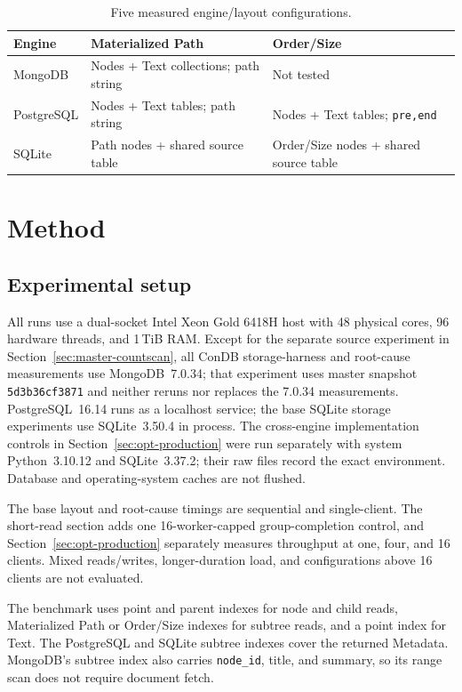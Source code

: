 \documentclass[10pt]{article}
\newcommand{\code}[1]{\texttt{#1}}
\newcommand{\hdr}{\rowcolor{hdrgray}}
\newenvironment{ctab}{\par\smallskip\centering\small
  \setlength{\tabcolsep}{5pt}\renewcommand{\arraystretch}{1.12}}{\par\smallskip}
\begin{document}
\begin{table}[ht]
\caption{Five measured engine/layout configurations.}
\label{tab:layouts}
\begin{ctab}
\begin{tabular}{@{}lll@{}}
\toprule
\hdr Engine & Materialized Path & Order/Size \\
\midrule
MongoDB    & Nodes + Text collections; path string & Not tested \\
PostgreSQL & Nodes + Text tables; path string      & Nodes + Text tables; \code{pre,end} \\
SQLite     & Path nodes + shared source table       & Order/Size nodes + shared source table \\
\bottomrule
\end{tabular}
\end{ctab}
\end{table}

\section{Method}\label{sec:method}

\subsection{Experimental setup}

All runs use a dual-socket Intel Xeon Gold 6418H host with 48 physical cores,
96 hardware threads, and 1\,TiB RAM. Except for the separate source experiment
in Section~\ref{sec:master-countscan}, all ConDB storage-harness and root-cause
measurements use MongoDB~7.0.34; that experiment uses master snapshot
\code{5d3b36cf3871} and neither reruns nor replaces the 7.0.34 measurements.
PostgreSQL~16.14 runs as a localhost service; the base SQLite storage
experiments use SQLite~3.50.4 in process. The cross-engine implementation controls in
Section~\ref{sec:opt-production} were
run separately with system Python~3.10.12 and SQLite~3.37.2; their raw files
record the exact environment. Database and operating-system caches are not
flushed.

The base layout and root-cause timings are sequential and single-client. The
short-read section adds one 16-worker-capped group-completion control, and
Section~\ref{sec:opt-production} separately measures throughput at one, four,
and 16 clients. Mixed reads/writes, longer-duration load, and configurations
above 16 clients are not evaluated.

The benchmark uses point and parent indexes for node and child reads,
Materialized Path or Order/Size indexes for subtree reads, and a point index
for Text. The PostgreSQL and SQLite subtree indexes cover the returned
Metadata. MongoDB's subtree index also carries \code{node\_id}, title, and
summary, so its range scan does not require document fetch.
\end{document}
